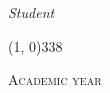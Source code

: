 \begin{titlepage}
\begin{center}
\begin{large}
\vspace{0pt} 

\begin{flushright}
\textit{Student}\\ 
\vspace{5pt} 
\myName
\end{flushright}
\end{large}

\vspace{15pt}

\line(1, 0){338} \\
\begin{normalsize}
\textsc{Academic year \myAA}
\end{normalsize}

\end{center}
\end{titlepage} 